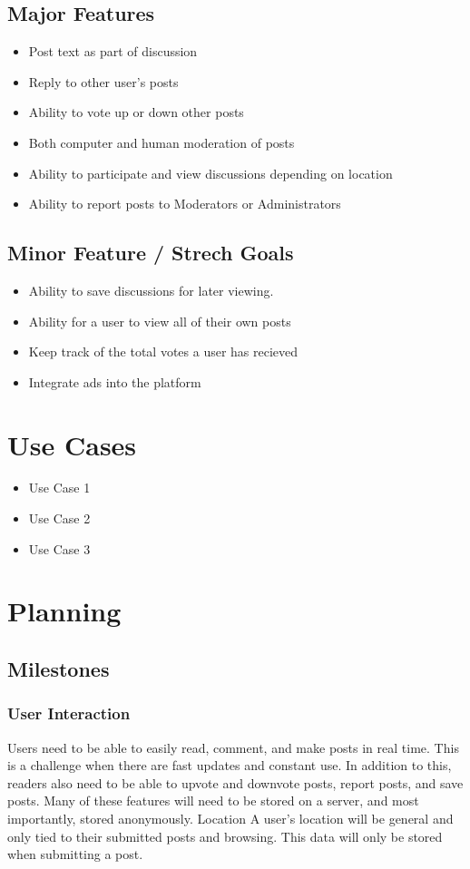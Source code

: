 \documentclass[12pt]{article}
\begin{document}
\subsection{Major Features}
\begin{itemize}
      \item Post text as part of discussion
      \item Reply to other user's posts
      \item Ability to vote up or down other posts
      \item Both computer and human moderation of posts
      \item Ability to participate and view discussions depending on location
      \item Ability to report posts to Moderators or Administrators
\end{itemize}
\subsection{Minor Feature / Strech Goals}
\begin{itemize}
      \item Ability to save discussions for later viewing.
      \item Ability for a user to view all of their own posts
      \item Keep track of the total votes a user has recieved
      \item Integrate ads into the platform
\end{itemize}
\section{Use Cases}

\begin{itemize}
  \item Use Case 1
  \item Use Case 2
  \item Use Case 3
\end{itemize}

\section{Planning}
\subsection{Milestones}
\subsubsection{User Interaction}
	Users need to be able to easily read, comment, and make posts in real time. This is a challenge when there are fast updates and constant use. In addition to this, readers also need to be able to upvote and downvote posts, report posts, and save posts. Many of these features will need to be stored on a server, and most importantly, stored anonymously.
Location
	A user’s location will be general and only tied to their submitted posts and browsing. This data will only be stored when submitting a post.
\end{document}

